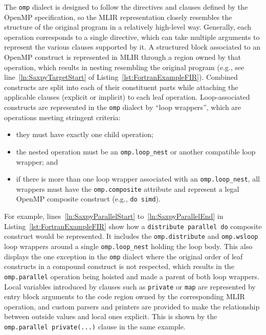 \documentclass[acmtog,natbib=false]{acmart}
\newcommand{\code}[1]{\texttt{#1}\xspace}
\begin{document}
The \code{omp} dialect is designed to follow the directives and clauses defined by the OpenMP specification, so the \ac{MLIR} representation closely resembles the structure of the original program in a relatively high-level way.
Generally, each operation corresponds to a single directive, which can take multiple arguments to represent the various clauses supported by it.
A structured block associated to an OpenMP construct is represented in \ac{MLIR} through a region owned by that operation, which results in nesting resembling the original program (e.g., see line~\ref{ln:SaxpyTargetStart} of Listing~\ref{lst:FortranExampleFIR}).
Combined constructs are split into each of their constituent parts while attaching the applicable clauses (explicit or implicit) to each leaf operation.
Loop-associated constructs are represented in the \code{omp} dialect by ``loop wrappers'', which are operations meeting stringent criteria:

\begin{itemize}
    \item they must have exactly one child operation;
    \item the nested operation must be an \code{omp.loop\_nest} or another compatible loop wrapper; and
    \item if there is more than one loop wrapper associated with an \code{omp.loop\_nest}, all wrappers must have the \code{omp.composite} attribute and represent a legal OpenMP composite construct (e.g., \code{do simd}).
\end{itemize}

For example, lines~\ref{ln:SaxpyParallelStart} to~\ref{ln:SaxpyParallelEnd} in Listing~\ref{lst:FortranExampleFIR} show how a \code{distribute parallel do} composite construct would be represented.
It includes the \code{omp.distribute} and \code{omp.wsloop} loop wrappers around a single \code{omp.loop\_nest} holding the loop body.
This also displays the one exception in the \code{omp} dialect where the original order of leaf constructs in a compound construct is not respected, which results in the \code{omp.parallel} operation being hoisted and made a parent of both loop wrappers.
Local variables introduced by clauses such as \code{private} or \code{map} are represented by entry block arguments to the code region owned by the corresponding \ac{MLIR} operation, and custom parsers and printers are provided to make the relationship between outside values and local ones explicit.
This is shown by the \code{omp.parallel private(...)} clause in the same example.
\end{document}
